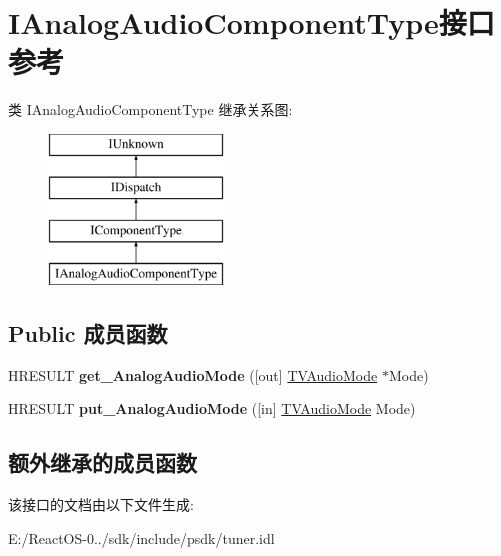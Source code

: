 \hypertarget{interface_i_analog_audio_component_type}{}\section{I\+Analog\+Audio\+Component\+Type接口 参考}
\label{interface_i_analog_audio_component_type}
类 I\+Analog\+Audio\+Component\+Type 继承关系图\+:\begin{figure}[H]
\begin{center}
\leavevmode
\includegraphics[height=4.000000cm]{interface_i_analog_audio_component_type}
\end{center}
\end{figure}
\subsection*{Public 成员函数}
\begin{DoxyCompactItemize}
\item 
\mbox{\label{interface_i_analog_audio_component_type_a5d888378cd254cb2042b22e4980df61b}} 
H\+R\+E\+S\+U\+LT {\bfseries get\+\_\+\+Analog\+Audio\+Mode} (\mbox{[}out\mbox{]} \hyperlink{interfaceenum}{T\+V\+Audio\+Mode} $\ast$Mode)
\item 
\mbox{\label{interface_i_analog_audio_component_type_a5d15d355fbe3aac7efbb93aa19f5cdc7}} 
H\+R\+E\+S\+U\+LT {\bfseries put\+\_\+\+Analog\+Audio\+Mode} (\mbox{[}in\mbox{]} \hyperlink{interfaceenum}{T\+V\+Audio\+Mode} Mode)
\end{DoxyCompactItemize}
\subsection*{额外继承的成员函数}


该接口的文档由以下文件生成\+:\begin{DoxyCompactItemize}
\item 
E\+:/\+React\+O\+S-\/0../sdk/include/psdk/tuner.\+idl\end{DoxyCompactItemize}
